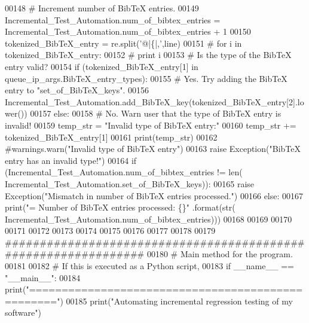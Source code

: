 \begin{DoxyCode}
00148                 \textcolor{comment}{# Increment number of BibTeX entries.}
00149                 Incremental\_Test\_Automation.num\_of\_bibtex\_entries = 
      Incremental\_Test\_Automation.num\_of\_bibtex\_entries + 1
00150                 tokenized\_BibTeX\_entry = re.split(\textcolor{stringliteral}{'@|\{|,'},line)
00151 \textcolor{comment}{#               for i in tokenized\_BibTeX\_entry:}
00152 \textcolor{comment}{#                   print i}
00153                 \textcolor{comment}{# Is the type of the BibTeX entry valid?}
00154                 \textcolor{keywordflow}{if} (tokenized\_BibTeX\_entry[1] \textcolor{keywordflow}{in} queue\_ip\_args.BibTeX\_entry\_types):
00155                     \textcolor{comment}{# Yes. Try adding the BibTeX entry to "set\_of\_BibTeX\_keys".}
00156                     Incremental\_Test\_Automation.add\_BibTeX\_key(tokenized\_BibTeX\_entry[2].lower())
00157                 \textcolor{keywordflow}{else}:
00158                     \textcolor{comment}{# No. Warn user that the type of BibTeX entry is invalid!}
00159                     temp\_str = \textcolor{stringliteral}{"Invalid type of BibTeX entry:"}
00160                     temp\_str += tokenized\_BibTeX\_entry[1]
00161                     print(temp\_str)
00162                     \textcolor{comment}{#warnings.warn("Invalid type of BibTeX entry")}
00163                     \textcolor{keywordflow}{raise} Exception(\textcolor{stringliteral}{"BibTeX entry has an invalid type!"})
00164         \textcolor{keywordflow}{if} (Incremental\_Test\_Automation.num\_of\_bibtex\_entries != len(
      Incremental\_Test\_Automation.set\_of\_BibTeX\_keys)):
00165             \textcolor{keywordflow}{raise} Exception(\textcolor{stringliteral}{"Mismatch in number of BibTeX entries processed."})
00166         \textcolor{keywordflow}{else}:
00167             print(\textcolor{stringliteral}{"=    Number of BibTeX entries processed: \{\}"} .format(str(
      Incremental\_Test\_Automation.num\_of\_bibtex\_entries)))
00168 
00169 
00170 
00171 
00172 
00173 
00174 
00175 
00176 
00177 
00178 
00179 \textcolor{comment}{###############################################################}
00180 \textcolor{comment}{# Main method for the program.}
00181 
00182 \textcolor{comment}{#   If this is executed as a Python script,}
00183 \textcolor{keywordflow}{if} \_\_name\_\_ == \textcolor{stringliteral}{"\_\_main\_\_"}:
00184     print(\textcolor{stringliteral}{"=================================================="})
00185     print(\textcolor{stringliteral}{"Automating incremental regression testing of my software"})

\end{DoxyCode}
